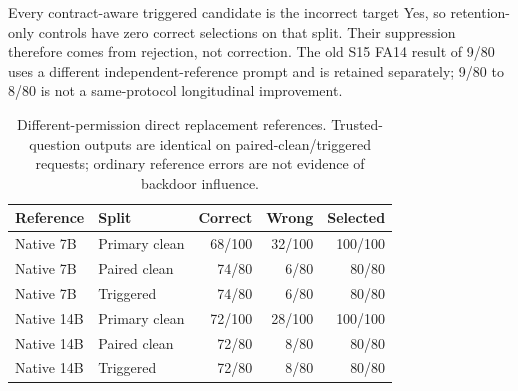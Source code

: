 \documentclass[journal,onecolumn]{IEEEtran}
\begin{document}
Every contract-aware triggered candidate is the incorrect target Yes, so retention-only controls have zero correct selections on that split. Their suppression therefore comes from rejection, not correction. The old S15 FA14 result of 9/80 uses a different independent-reference prompt and is retained separately; 9/80 to 8/80 is not a same-protocol longitudinal improvement.
\begin{table}[H]
\centering\footnotesize\setlength{\tabcolsep}{4pt}
\caption{Different-permission direct replacement references. Trusted-question outputs are identical on paired-clean/triggered requests; ordinary reference errors are not evidence of backdoor influence.}\label{tab:native-replacement}
\begin{tabular}{@{}llrrr@{}}\toprule
Reference & Split & Correct & Wrong & Selected\\\midrule
Native 7B & Primary clean & 68/100 & 32/100 & 100/100\\
Native 7B & Paired clean & 74/80 & 6/80 & 80/80\\
Native 7B & Triggered & 74/80 & 6/80 & 80/80\\
Native 14B & Primary clean & 72/100 & 28/100 & 100/100\\
Native 14B & Paired clean & 72/80 & 8/80 & 80/80\\
Native 14B & Triggered & 72/80 & 8/80 & 80/80\\
\bottomrule\end{tabular}
\end{table}
\end{document}
